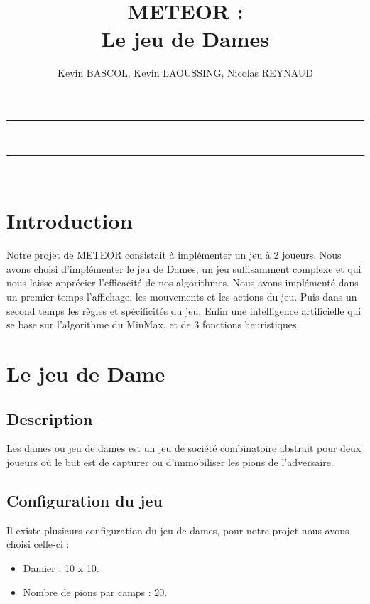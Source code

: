 \documentclass[10pt,a4paper]{report}
\author{Kevin BASCOL, Kevin LAOUSSING, Nicolas REYNAUD}
\title{METEOR : \\ \vspace*{0.5cm} Le jeu de Dames}
\begin{document}
\makeatletter
	\begin{titlepage}
	
	\centering
		{
		\vspace*{5cm}
		\hrule height 2pt
		\vspace{0.7cm}
		\Huge \textbf{\@title}}\\
		\vspace{0.7cm}
		\hrule height 2pt
		
		\vfill
		\vspace{1cm}
		\@author\\
		\end{titlepage}
\makeatother
\setcounter{secnumdepth}{4}
\setcounter{tocdepth}{3}
\renewcommand{\contentsname}{Sommaire}
\begingroup\makeatletter
\def\@makeschapterhead#1{%
  {\parindent \z@ \raggedright
    \normalfont
    \interlinepenalty\@M
    \Huge \bfseries  #1\par\nobreak
    \vskip 20pt%
  }}\makeatother
\tableofcontents
\endgroup
\thispagestyle{empty}
\setcounter{page}{0}
\newpage


\section{Introduction}
	Notre projet de METEOR consistait à implémenter un jeu à 2 joueurs. Nous avons choisi d'implémenter le jeu de Dames, un jeu suffisamment complexe et qui nous laisse apprécier l'efficacité de nos algorithmes.
Nous avons implémenté dans un premier temps l'affichage, les mouvements et les actions du jeu. Puis dans un second temps les règles et spécificités du jeu. Enfin une intelligence artificielle qui se base sur l'algorithme du MinMax, et de 3 fonctions heuristiques.
\section{Le jeu de Dame}
	\subsection{Description}
	Les dames ou jeu de dames est un jeu de société combinatoire abstrait pour deux joueurs où le but est de capturer ou d'immobiliser les pions de l'adversaire.
	\subsection{Configuration du jeu}
	Il existe plusieurs configuration du jeu de dames, pour notre projet nous avons choisi celle-ci :
	\begin{itemize}[label = $\blacktriangleright$]
		\item Damier :  10 x 10.
		\item Nombre de pions par camps : 20.
	\end{itemize}
	
\end{document}
